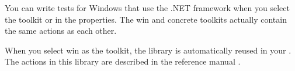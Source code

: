 You can write tests for Windows \gdauts{} that use the .NET framework when you select the toolkit  or  in the \gdproject{} properties. The win and concrete toolkits actually contain the same actions as each other. 

When you select win as the \gdproject{} toolkit, the library \gdproject{}  is automatically reused in your \gdproject{}. The actions in this library are described in the reference manual .
